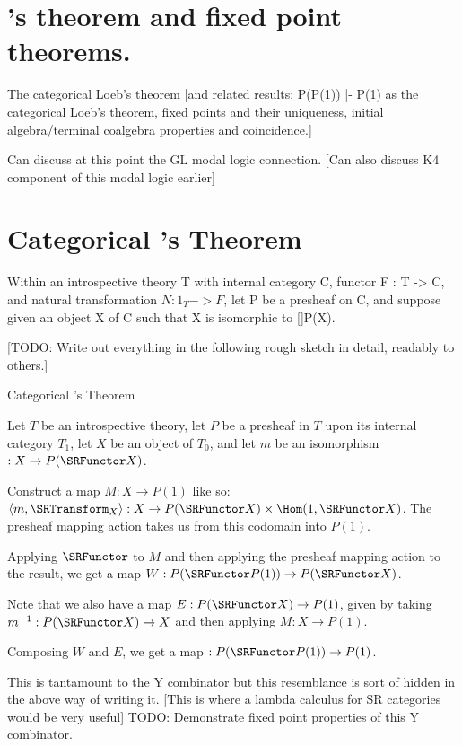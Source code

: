 \section{\Loeb's theorem and fixed point theorems.}

The categorical Loeb’s theorem [and related results: P(P(1)) |- P(1) as the categorical Loeb’s theorem, fixed points and their uniqueness, initial algebra/terminal coalgebra properties and coincidence.]

Can discuss at this point the GL modal logic connection. [Can also discuss K4 component of this modal logic earlier]

\section{Categorical \Loeb's Theorem}
Within an introspective theory T with internal category C, functor F : T -> C, and natural transformation $N : 1_T -> F$, let P be a presheaf on C, and suppose given an object X of C such that X is isomorphic to []P(X).

[TODO: Write out everything in the following rough sketch in detail, readably to others.]

\begin{theorem}
Categorical \Loeb's Theorem
\end{theorem}
Let $T$ be an introspective theory, let $P$ be a presheaf in $T$ upon its internal category $T_1$, let $X$ be an object of $T_0$, and let $m$ be an isomorphism $: X \to P(\SRFunctor X)$.

Construct a map $M : X \to P(1)$ like so: $\langle m, \SRTransform_X \rangle : X \to P(\SRFunctor X) \times \Hom(1, \SRFunctor X)$. The presheaf mapping action takes us from this codomain into $P(1)$.

Applying $\SRFunctor$ to $M$ and then applying the presheaf mapping action to the result, we get a map $W : P(\SRFunctor P(1)) \to P(\SRFunctor X)$.

Note that we also have a map $E : P(\SRFunctor X) \to P(1)$, given by taking $m^{-1} : P(\SRFunctor X) \to X$ and then applying $M : X \to P(1)$.

Composing $W$ and $E$, we get a map $: P(\SRFunctor P(1)) \to P(1)$.

This is tantamount to the Y combinator but this resemblance is sort of hidden in the above way of writing it. [This is where a lambda calculus for SR categories would be very useful] TODO: Demonstrate fixed point properties of this Y combinator.

